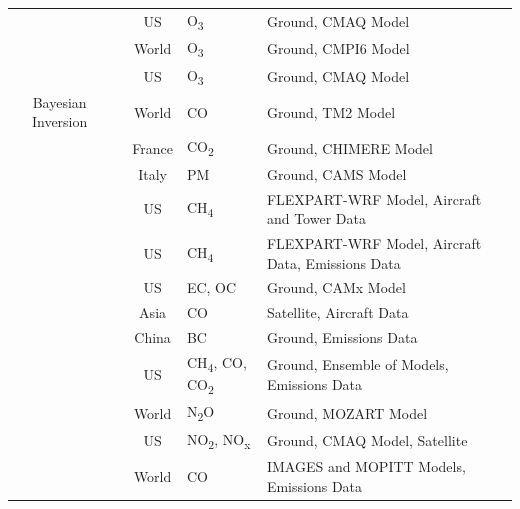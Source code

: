 \begin{landscape}
\begin{longtable}{c p{4cm} c p{4cm} p{6cm}}
  & \cite{Sahu2015BayesianStates} & US & O\textsubscript{3} & Ground, CMAQ Model  \\
 
   & \cite{Sun2021Multi-stageModelsb} & World & O\textsubscript{3} & Ground, CMPI6 Model  \\
   
  & \cite{Turner2016Long-TermStudy} & US & O\textsubscript{3} & Ground, CMAQ Model \\
  
 Bayesian Inversion & \cite{Bergamaschi2000InverseRatios} & World & CO & Ground, TM2 Model  \\
 
   & \cite{Breon2015AnMeasurements} & France & CO\textsubscript{2} & Ground, CHIMERE Model  \\
   
  & \cite{Chianese2018SpatiotemporallySimulationsc} & Italy & PM & Ground, CAMS Model \\
  
 & \cite{Cui2019A2014-2016} & US & CH\textsubscript{4} & FLEXPART-WRF Model, Aircraft and Tower Data   \\
 
  & \cite{Cui2019InversionMeasurements} & US & CH\textsubscript{4} & FLEXPART-WRF Model, Aircraft Data, Emissions Data \\
  
   & \cite{DeFoy2015EstimatingSupersite} & US & EC, OC & Ground, CAMx Model  \\
   
   
  & \cite{Heald2004ComparativeMonoxide} & Asia & CO & Satellite, Aircraft Data  \\
  
 & \cite{Jia2021BlackChina} & China & BC & Ground, Emissions Data  \\
  
   & \cite{Lopez-Coto2020WintertimeTechnique} & US & CH\textsubscript{4}, CO, CO\textsubscript{2} & Ground, Ensemble of Models, Emissions Data  \\
   
  & \cite{Saikawa2014GlobalN2O} & World & N\textsubscript{2}O & Ground, MOZART Model  \\
  
 & \cite{Souri2016ConstrainingCampaign} & US & NO\textsubscript{2}, NO\textsubscript{x} & Ground, CMAQ Model, Satellite  \\
 
   & \cite{Stavrakou2006Grid-basedDatab} & World & CO & IMAGES and MOPITT Models, Emissions Data  \\
   

\end{longtable}
\end{landscape}

